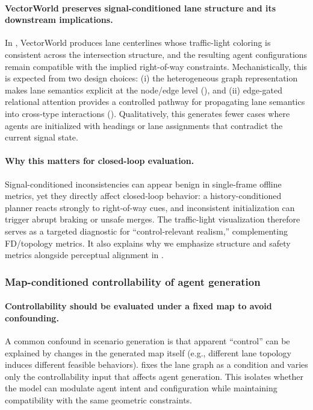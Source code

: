 \documentclass{article}
\theoremstyle{plain}
\theoremstyle{definition}
\theoremstyle{remark}
\begin{document}
\paragraph{VectorWorld preserves signal-conditioned lane structure and its downstream implications.}
In , VectorWorld produces lane centerlines whose traffic-light coloring is consistent across the intersection structure,
and the resulting agent configurations remain compatible with the implied right-of-way constraints.
Mechanistically, this is expected from two design choices:
(i) the heterogeneous graph representation makes lane semantics explicit at the node/edge level (),
and (ii) edge-gated relational attention provides a controlled pathway for propagating lane semantics into cross-type interactions ().
Qualitatively, this generates fewer cases where agents are initialized with headings or lane assignments that contradict the current signal state.

\paragraph{Why this matters for closed-loop evaluation.}
Signal-conditioned inconsistencies can appear benign in single-frame offline metrics, yet they directly affect closed-loop behavior:
a history-conditioned planner reacts strongly to right-of-way cues, and inconsistent initialization can trigger abrupt braking or unsafe merges.
The traffic-light visualization therefore serves as a targeted diagnostic for “control-relevant realism,” complementing FD/topology metrics.
It also explains why we emphasize structure and safety metrics alongside perceptual alignment in .

\subsubsection{Map-conditioned controllability of agent generation}
\label{app:vis:control}
\paragraph{Controllability should be evaluated under a fixed map to avoid confounding.}
A common confound in scenario generation is that apparent “control” can be explained by changes in the generated map itself
(e.g., different lane topology induces different feasible behaviors).
 fixes the lane graph as a condition and varies only the controllability input that affects agent generation.
This isolates whether the model can modulate agent intent and configuration while maintaining compatibility with the same geometric constraints.
\end{document}
